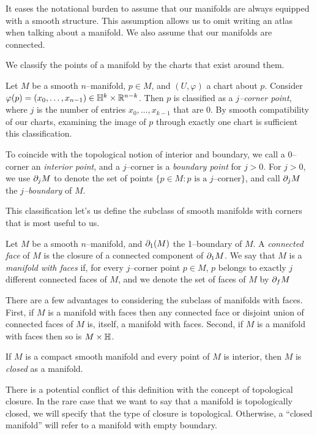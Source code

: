 It eases the notational burden to assume that our manifolds are always equipped with a smooth structure.
This assumption allows us to omit writing an atlas when talking about a manifold.
We also assume that our manifolds are connected.

We classify the points of a manifold by the charts that exist around them.

\begin{defn}
	Let $M$ be a smooth $n$--manifold, $p\in M$, and $(U,\varphi)$ a chart about $p$.
	Consider $\varphi(p)=(x_0,\dots,x_{n-1})\in \mathbb{H}^k\times\mathbb{R}^{n-k}$.
	Then $p$ is classified as a \emph{$j$--corner point}, where $j$ is the number of entries $x_0,\dots,x_{k-1}$ that are 0.
	By smooth compatibility of our charts, examining the image of $p$ through exactly one chart is sufficient this classification.
	
	To coincide with the topological notion of interior and boundary, we call a $0$--corner an \emph{interior point}, and a $j$--corner is a \emph{boundary point} for $j>0$.
	For $j>0$, we use $\partial_j M$ to denote the set of points $\{p\in M:p\textrm{ is a }j\textrm{--corner}\}$, and call $\partial_j M$ the \emph{$j$--boundary} of $M$. 
\end{defn}	

This classification let's us define the subclass of smooth manifolds with corners that is most useful to us.

\begin{defn}
	Let $M$ be a smooth $n$--manifold, and $\partial_1(M)$ the 1--boundary of $M$.
	A \emph{connected face} of $M$ is the closure of a connected component of $\partial_1 M$.
	We say that $M$ is a \emph{manifold with faces} if, for every $j$--corner point $p\in M$, $p$ belongs to exactly $j$ different connected faces of $M$, and we denote the set of faces of $M$ by $\partial_f M$
\end{defn}

There are a few advantages to considering the subclass of manifolds with faces.
First, if $M$ is a manifold with faces then any connected face or disjoint union of connected faces of $M$ is, itself, a manifold with faces.
Second, if $M$ is a manifold with faces then so is $M\times \mathbb{H}$.
	
\begin{defn}
	If $M$ is a compact smooth manifold and every point of $M$ is interior, then $M$ is \emph{closed} as a manifold.
\end{defn}

There is a potential conflict of this definition with the concept of topological closure.
In the rare case that we want to say that a manifold is topologically closed, we will specify that the type of closure is topological.
Otherwise, a ``closed manifold'' will refer to a manifold with empty boundary.

